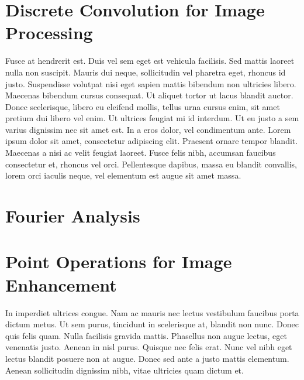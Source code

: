 \documentclass{sydeStyle}
\begin{document}
\section*{Discrete Convolution for Image Processing}
Fusce at hendrerit est. Duis vel sem eget est vehicula facilisis. Sed
mattis laoreet nulla non suscipit. Mauris dui neque, sollicitudin vel
pharetra eget, rhoncus id justo. Suspendisse volutpat nisi eget sapien
mattis bibendum non ultricies libero. Maecenas bibendum cursus consequat.
Ut aliquet tortor ut lacus blandit auctor. Donec scelerisque, libero eu
eleifend mollis, tellus urna cursus enim, sit amet pretium dui libero vel
enim. Ut ultrices feugiat mi id interdum. Ut eu justo a sem varius
dignissim nec sit amet est. In a eros dolor, vel condimentum ante. Lorem
ipsum dolor sit amet, consectetur adipiscing elit. Praesent ornare tempor
blandit. Maecenas a nisi ac velit feugiat laoreet. Fusce felis nibh,
accumsan faucibus consectetur et, rhoncus vel orci. Pellentesque dapibus,
massa eu blandit convallis, lorem orci iaculis neque, vel elementum est
augue sit amet massa.

\section*{Fourier Analysis}







\section*{Point Operations for Image Enhancement}
In imperdiet ultrices congue. Nam ac mauris nec lectus vestibulum faucibus
porta dictum metus. Ut sem purus, tincidunt in scelerisque at, blandit non
nunc. Donec quis felis quam. Nulla facilisis gravida mattis. Phasellus non
augue lectus, eget venenatis justo. Aenean in nisl purus. Quisque nec felis
erat. Nunc vel nibh eget lectus blandit posuere non at augue. Donec sed
ante a justo mattis elementum. Aenean sollicitudin dignissim nibh, vitae
ultricies quam dictum et.
\end{document}
